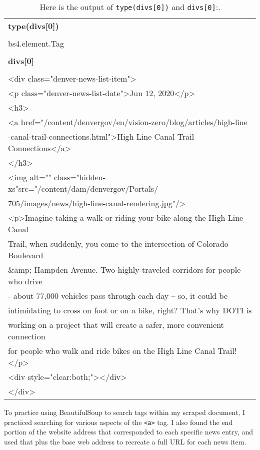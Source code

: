 \documentclass[]{article}
\newcommand{\code}[1]{\colorbox{light-gray}{\texttt{#1}}}
\begin{document}
\begin{table}[!ht]
	\begin{center}
		\caption{Here is the output of \code{type(divs[0])} and \code{divs[0]}:.}
		\label{tab:table1}
		\begin{tabular}{|l|} 
			\hline
			\textbf{type(divs[0])}\\
			\\
			\hline
			bs4.element.Tag\\
			\\
			\hline
			\textbf{divs[0]}\\
			\\
			\hline
			<div class="denver-news-list-item">\\
			<p class="denver-news-list-date">Jun 12, 2020</p>\\
			<h3>\\
		<a href="/content/denvergov/en/vision-zero/blog/articles/high-line\\
		-canal-trail-connections.html">High Line Canal Trail Connections</a>\\
		</h3>\\
			<img alt="" class="hidden-xs"src="/content/dam/denvergov/Portals/\\
			705/images/news/high-line-canal-rendering.jpg"/>\\
			<p>Imagine taking a walk or riding your bike along the High Line Canal \\
			Trail, when suddenly, you come to the intersection of Colorado Boulevard \\
			\&amp; Hampden Avenue. Two highly-traveled corridors for people who drive \\
			- about 77,000 vehicles pass through each day – so, it could be \\
			intimidating to cross on foot or on a bike, right? That’s why DOTI is \\
			working on a project that will create a safer, more convenient connection\\
			 for people who walk and ride bikes on the High Line Canal Trail!</p>\\
			<div style="clear:both;"></div>\\
			</div>\\
			\hline
		\end{tabular}
	\end{center}
\end{table}
To practice using BeautifulSoup to search tags within my scraped document, I practiced searching for various aspects of the \code{<a>} tag.  I also found the end portion of the website address that corresponded to each specific news entry, and used that plus the base web address to recreate a full URL for each news item.
\end{document}
